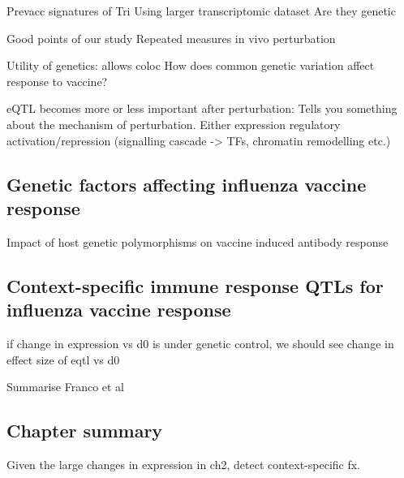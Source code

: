 Prevacc signatures of Tri
Using larger transcriptomic dataset
Are they genetic

Good points of our study
    Repeated measures
    in vivo perturbation

Utility of genetics:
allows coloc
How does common genetic variation affect response to vaccine?

eQTL becomes more or less important after perturbation: Tells you something about the mechanism of perturbation.
Either expression regulatory activation/repression (signalling cascade -> TFs, chromatin remodelling etc.)

\subsection{Genetic factors affecting influenza vaccine response}


Impact of host genetic polymorphisms on vaccine induced antibody response


\subsection{Context-specific immune response QTLs for influenza vaccine response}

if change in expression vs d0 is under genetic control, we should see change in effect size of eqtl vs d0

Summarise Franco et al

\subsection{Chapter summary}

Given the large changes in expression in ch2, detect context-specific fx.

